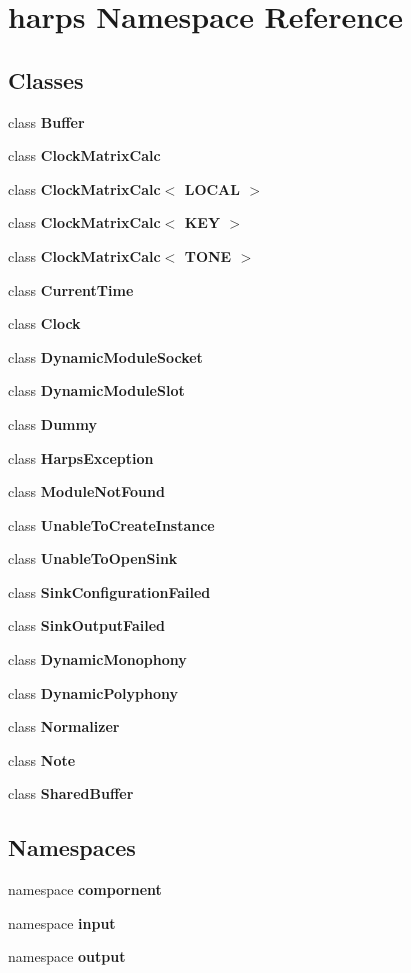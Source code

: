 \section{harps Namespace Reference}
\label{namespaceharps}


\subsection*{Classes}
\begin{CompactItemize}
\item 
class {\bf Buffer}
\item 
class {\bf ClockMatrixCalc}
\item 
class {\bf ClockMatrixCalc$<$ LOCAL $>$}
\item 
class {\bf ClockMatrixCalc$<$ KEY $>$}
\item 
class {\bf ClockMatrixCalc$<$ TONE $>$}
\item 
class {\bf CurrentTime}
\item 
class {\bf Clock}
\item 
class {\bf DynamicModuleSocket}
\item 
class {\bf DynamicModuleSlot}
\item 
class \textbf{Dummy}
\item 
class {\bf HarpsException}
\item 
class {\bf ModuleNotFound}
\item 
class {\bf UnableToCreateInstance}
\item 
class {\bf UnableToOpenSink}
\item 
class {\bf SinkConfigurationFailed}
\item 
class {\bf SinkOutputFailed}
\item 
class {\bf DynamicMonophony}
\item 
class {\bf DynamicPolyphony}
\item 
class {\bf Normalizer}
\item 
class {\bf Note}
\item 
class {\bf SharedBuffer}
\end{CompactItemize}
\subsection*{Namespaces}
\begin{CompactItemize}
\item 
namespace {\bf compornent}
\item 
namespace {\bf input}
\item 
namespace {\bf output}
\end{CompactItemize}
